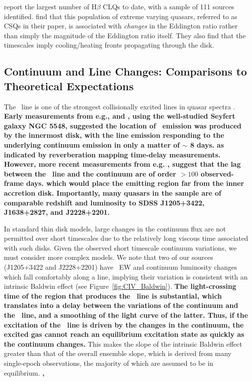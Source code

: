\documentclass[fleqn,usenatbib]{mnras}
\begin{document}
\citet{Graham2020} report the largest number of H$\beta$ CLQs to
date, with a sample of 111 sources identified. \citet{Graham2020}
find that this population of extreme varying quasars, referred to as
CSQs in their paper, is associated with {\it changes} in the Eddington
ratio rather than simply the magnitude of the Eddington ratio itself.
They also find that the timescales imply cooling/heating fronts
propagating through the disk.


\subsection{Continuum and Line Changes: Comparisons to Theoretical Expectations}\label{sec:theory}
The \civ\ line is one of the strongest collisionally excited lines in
quasar spectra \citep[e.g.,][]{HamannFerland1999}.
{\bf Early measurements from e.g., 
  \citet{PoggePeterson1992} and \citet{Peterson1997book}, 
  using the well-studied Seyfert galaxy NGC 5548,
  suggested the location of \civ\ emission was 
  produced by the innermost disk, with the line emission
  responding to the underlying continuum emission in only
  a matter of $\sim$ 8 days. 
as indicated by reverberation mapping time-delay measurements.
However, more recent measurements from e.g. \citet[][and references therein]{Grier2019},
suggest that the lag between the \civ\ line and the continuum are of order $>100$ observed-frame days. 
which would place the \civ emitting region far from the inner accretion disk.
Importantly, many quasars in the \citet{Grier2019} sample are of
comparable redshift and luminosity to SDSS J1205+3422, J1638+2827, and J2228+2201.}


In standard \citet{SS73} thin disk models, large changes in the
continuum flux are not permitted over short timescales due to the
relatively long viscous time associated with such disks. Given the
observed short timescale continuum variations, we must consider more
complex models. We note that two of our sources (J1205+3422 and
J2228+2201) have \civ\ EW and continuum luminosity changes which fall
comfortably along a line, implying their variation is consistent with
an intrinsic Baldwin effect (see Figure~\ref{fig:CIV_Baldwin}).
{\bf The light-crossing time of the region that produces the \civ\ line is substantial,
which translates into a delay between the variations of the continuum and
the \civ\ line, and a smoothing of the light curve of the latter.
Thus, if the excitation of the \civ\ line is driven by the changes in the
continuum, the excited gas cannot reach an equilibrium
excitation state as quickly as the continuum changes.}
This makes the slope of the intrinsic Baldwin effect greater than that
of the overall ensemble slope, which is derived from many single-epoch
observations, the majority of which are assumed to be in equilibrium.
{\bf \citet{Grier2019}, }
\end{document}
